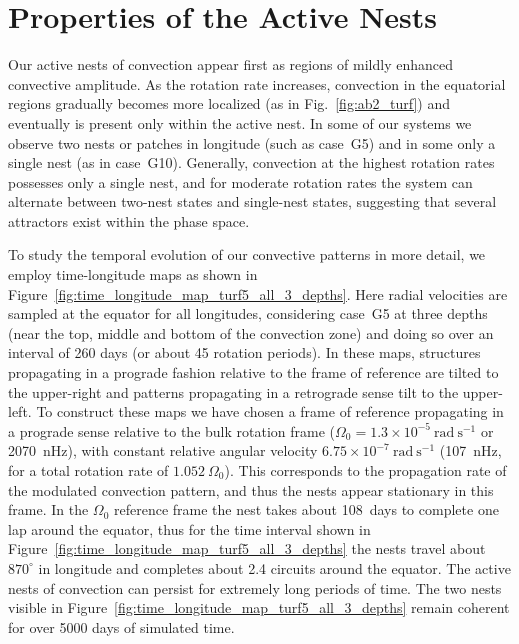 \section{Properties of the Active Nests}
Our active nests of convection appear first as regions of mildly
enhanced convective amplitude.  As the rotation rate increases, convection
in the equatorial regions gradually becomes more localized (as in Fig.~\ref{fig:ab2_turf}) and eventually is
present only within the active nest.  In some of our systems we observe two
nests or patches in longitude (such as case~G5) and in some only a
single nest (as in case~G10).  Generally,
convection at the highest rotation rates possesses only a single nest, and
for moderate rotation rates the system can alternate between two-nest
states and single-nest states, suggesting that several attractors
exist within the phase space.

To study the temporal evolution of our convective patterns in more
detail, we employ time-longitude maps as shown in
Figure~\ref{fig:time_longitude_map_turf5_all_3_depths}.  Here radial
velocities are sampled at the equator for all longitudes, considering
case~G5 at three depths (near the top, middle and bottom of the
convection zone) and doing so over an interval of 260 days (or about
45 rotation periods).  In these maps, structures propagating in a
prograde fashion relative to the frame of reference are tilted to the
upper-right and patterns propagating in a retrograde sense tilt to the
upper-left.  To construct these maps we have chosen a frame of
reference propagating in a prograde sense relative to the bulk
rotation frame ($\Omega_0=1.3 \times 10^{-5}~\mathrm{rad}~\mathrm{s}^{-1}$ 
or 2070~nHz), with constant relative angular velocity 
$6.75 \times 10^{-7}~\mathrm{rad}~\mathrm{s}^{-1}$
(107~nHz, for a total rotation rate of $1.052~\Omega_0$).  This
corresponds to the propagation rate of the modulated convection
pattern, and thus the nests appear stationary in this frame.  In the
$\Omega_0$ reference frame the nest takes about 108~days to complete
one lap around the equator, thus for the time interval shown in
Figure~\ref{fig:time_longitude_map_turf5_all_3_depths} the nests
travel about $870^\circ$ in longitude and completes about 2.4 circuits
around the equator. The active nests of convection can persist for
extremely long periods of time.  The two nests visible in
Figure~\ref{fig:time_longitude_map_turf5_all_3_depths} remain
coherent for over 5000 days of simulated time.

